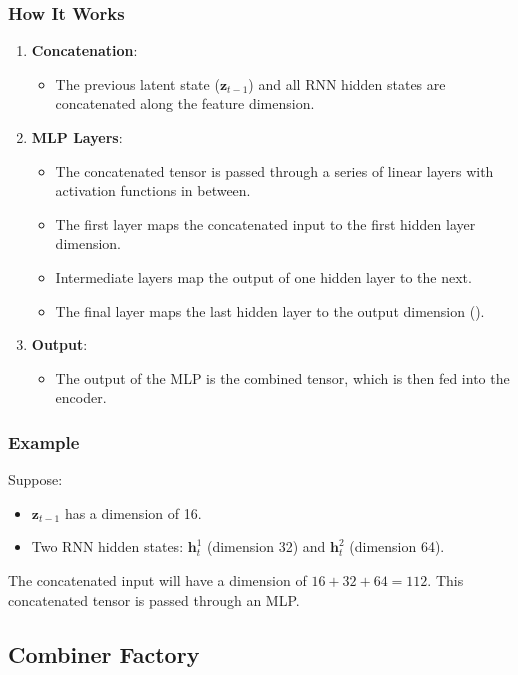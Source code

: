 \subsubsection*{How It Works}
\begin{enumerate}
    \item \textbf{Concatenation}:
        \begin{itemize}
            \item The previous latent state ($\bm{z}_{t-1}$) and all RNN hidden
            states are concatenated along the feature dimension.
        \end{itemize}
    \item \textbf{MLP Layers}:
        \begin{itemize}
            \item The concatenated tensor is passed through a series of
            linear layers with activation functions in between.
            \item The first layer maps the concatenated input to the first
            hidden layer dimension.
            \item Intermediate layers map the output of one hidden layer to
            the next.
            \item The final layer maps the last hidden layer to the output
            dimension ().
        \end{itemize}
    \item \textbf{Output}:
        \begin{itemize}
            \item The output of the MLP is the combined tensor, which is
            then fed into the encoder.
        \end{itemize}
\end{enumerate}

\subsubsection*{Example}
Suppose:
\begin{itemize}
    \item $\bm{z}_{t-1}$ has a dimension of 16.
    \item Two RNN hidden states: $\bm{h}^1_t$ (dimension 32) and $\bm{h}^2_t$ (dimension 64).
\end{itemize}
%
The concatenated input will have a dimension of \(16 + 32 + 64 = 112\).
This concatenated tensor is passed through an MLP.

\subsection{Combiner Factory}

